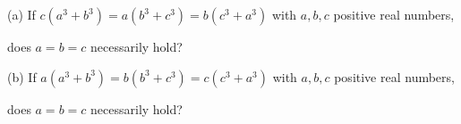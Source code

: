 (a) If $c(a^3+b^3) = a(b^3+c^3) = b(c^3+a^3)$ with $a, b, c$ positive real numbers,

does $a = b = c$ necessarily hold?

(b) If $a(a^3+b^3) = b(b^3+c^3) = c(c^3+a^3)$ with $a, b, c$  positive real numbers,

does $a = b = c$ necessarily hold?